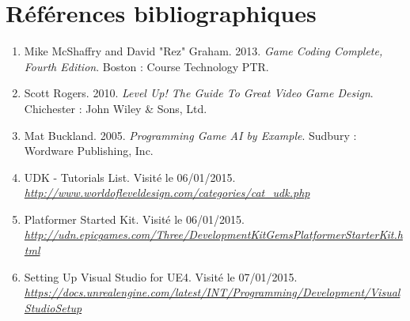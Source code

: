 \documentclass[11pt, a4paper, oneside]{article}
\begin{document}
\section{Références bibliographiques}
\begin{enumerate}
\item Mike McShaffry and David "Rez" Graham. 2013. \textit{Game Coding Complete, Fourth Edition}. Boston : Course Technology PTR.
\item Scott Rogers. 2010. \textit{Level Up! The Guide To Great Video Game Design}. Chichester : John Wiley \& Sons, Ltd.
\item Mat Buckland. 2005. \textit{Programming Game AI by Example}. Sudbury : Wordware Publishing, Inc.
\item UDK - Tutorials List. Visité le 06/01/2015.\\\textit{\url{http://www.worldofleveldesign.com/categories/cat_udk.php}}
\item Platformer Started Kit.  Visité le 06/01/2015.\\\textit{\url{http://udn.epicgames.com/Three/DevelopmentKitGemsPlatformerStarterKit.html}}
\item Setting Up Visual Studio for UE4. Visité le 07/01/2015.\\\textit{\url{https://docs.unrealengine.com/latest/INT/Programming/Development/VisualStudioSetup}}
\end{enumerate}
\newpage
\listoffigures
\end{document}
